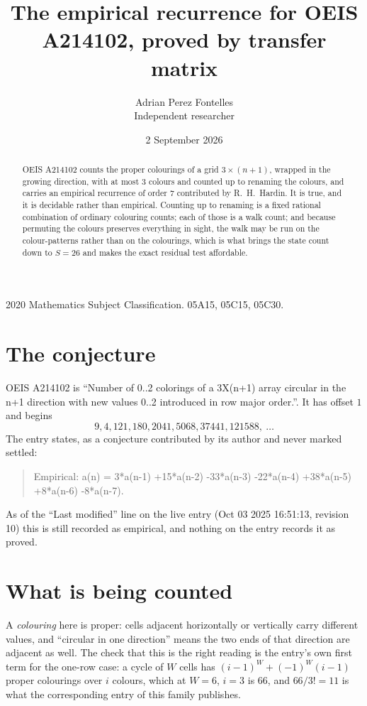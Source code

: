 \documentclass[11pt,a4paper]{article}
\title{The empirical recurrence for OEIS A214102, proved by transfer matrix}
\author{Adrian Perez Fontelles\\ \small Independent researcher}
\date{2 September 2026}
\theoremstyle{plain}
\theoremstyle{definition}
\begin{document}
\maketitle

\begin{abstract}
OEIS A214102 counts the proper colourings of a grid $3\times(n+1)$, wrapped in the growing direction, with at most $3$ colours and
counted up to renaming the colours, and carries an empirical recurrence of order $7$
contributed by R.~H.~Hardin. It is true, and it is decidable rather than empirical. Counting
up to renaming is a fixed rational combination of ordinary colouring counts; each of those is
a walk count; and because permuting the colours preserves everything in sight, the walk may be
run on the colour-patterns rather than on the colourings, which is what brings the state count
down to $S=26$ and makes the exact residual test affordable.
\end{abstract}

\noindent\small 2020 Mathematics Subject Classification. 05A15, 05C15, 05C30.\normalsize

\section{The conjecture}

OEIS A214102 is ``Number of 0..2 colorings of a 3X(n+1) array circular in the n+1 direction with new values 0..2 introduced in row major order.''. It has offset $1$ and begins
\[
9, 4, 121, 180, 2041, 5068, 37441, 121588,\ \dots
\]
The entry states, as a conjecture contributed by its author and never marked settled:
\begin{quote}
Empirical: a(n) = 3*a(n-1) +15*a(n-2) -33*a(n-3) -22*a(n-4) +38*a(n-5) +8*a(n-6) -8*a(n-7).
\end{quote}
As of the ``Last modified'' line on the live entry (Oct 03 2025 16:51:13, revision 10) this is still
recorded as empirical, and nothing on the entry records it as proved.

\section{What is being counted}

A \emph{colouring} here is proper: cells adjacent horizontally or vertically carry different
values, and ``circular in one direction'' means the two ends of that direction are adjacent as
well. The check that this is the right reading is the entry's own first term for the
one-row case: a cycle of $W$ cells has $(i-1)^W+(-1)^W(i-1)$ proper colourings over $i$
colours, which at $W=6$, $i=3$ is $66$, and $66/3!=11$ is what the corresponding entry of this
family publishes.
\end{document}
